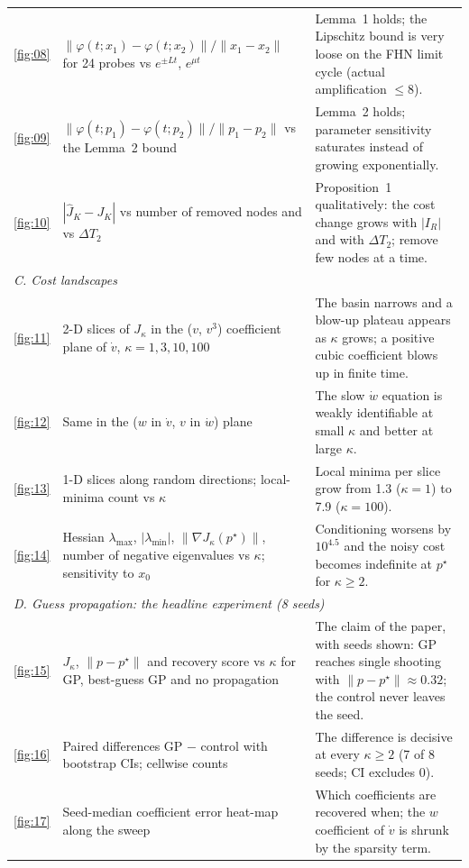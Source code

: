 \documentclass[10pt]{article}
\newcommand{\pstar}{p^\star}
\newcommand{\perr}{\lVert p - \pstar\rVert}
\begin{document}
\begin{longtable}{p{} p{} p{}}
\ref{fig:08} & $\lVert\varphi(t;x_1)-\varphi(t;x_2)\rVert/\lVert x_1-x_2\rVert$ for 24 probes vs $e^{\pm Lt}$, $e^{\mu t}$ & Lemma~1 holds; the Lipschitz bound is very loose on the FHN limit cycle (actual amplification $\le 8$).\\
\ref{fig:09} & $\lVert\varphi(t;p_1)-\varphi(t;p_2)\rVert/\lVert p_1-p_2\rVert$ vs the Lemma~2 bound & Lemma~2 holds; parameter sensitivity saturates instead of growing exponentially.\\
\ref{fig:10} & $|\hat J_K-J_K|$ vs number of removed nodes and vs $\Delta T_2$ & Proposition~1 qualitatively: the cost change grows with $|I_R|$ and with $\Delta T_2$; remove few nodes at a time.\\
\midrule
\multicolumn{3}{l}{\emph{C. Cost landscapes}}\\
\ref{fig:11} & 2-D slices of $J_\kappa$ in the ($v$, $v^3$) coefficient plane of $\dot v$, $\kappa=1,3,10,100$ & The basin narrows and a blow-up plateau appears as $\kappa$ grows; a positive cubic coefficient blows up in finite time.\\
\ref{fig:12} & Same in the ($w$ in $\dot v$, $v$ in $\dot w$) plane & The slow $\dot w$ equation is weakly identifiable at small $\kappa$ and better at large $\kappa$.\\
\ref{fig:13} & 1-D slices along random directions; local-minima count vs $\kappa$ & Local minima per slice grow from 1.3 ($\kappa=1$) to 7.9 ($\kappa=100$).\\
\ref{fig:14} & Hessian $\lambda_{\max}$, $|\lambda_{\min}|$, $\lVert\nabla J_\kappa(\pstar)\rVert$, number of negative eigenvalues vs $\kappa$; sensitivity to $x_0$ & Conditioning worsens by $10^{4.5}$ and the noisy cost becomes indefinite at $\pstar$ for $\kappa\ge2$.\\
\midrule
\multicolumn{3}{l}{\emph{D. Guess propagation: the headline experiment (8 seeds)}}\\
\ref{fig:15} & $J_\kappa$, $\perr$ and recovery score vs $\kappa$ for GP, best-guess GP and no propagation & The claim of the paper, with seeds shown: GP reaches single shooting with $\perr\approx0.32$; the control never leaves the seed.\\
\ref{fig:16} & Paired differences GP $-$ control with bootstrap CIs; cellwise counts & The difference is decisive at every $\kappa\ge2$ (7 of 8 seeds; CI excludes 0).\\
\ref{fig:17} & Seed-median coefficient error heat-map along the sweep & Which coefficients are recovered when; the $w$ coefficient of $\dot v$ is shrunk by the sparsity term.\\

\end{longtable}
\end{document}
